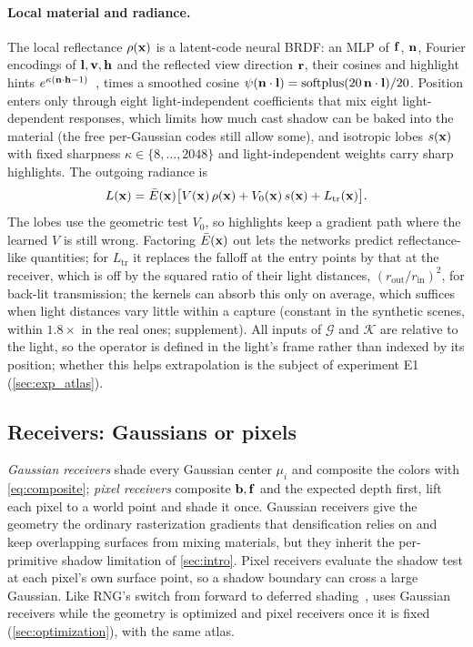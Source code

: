 \paragraph{Local material and radiance.}
The local reflectance $\rho(\mathbf{x})$ is a latent-code neural BRDF: an MLP of $\mathbf{f}$, $\mathbf{n}$, Fourier encodings of $\mathbf{l},\mathbf{v},\mathbf{h}$ and the reflected view direction $\mathbf{r}$, their cosines and highlight hints $e^{\kappa(\mathbf{n}\cdot\mathbf{h}-1)}$~\cite{zeng2023nrhints}, times a smoothed cosine $\psi(\mathbf{n}\cdot\mathbf{l})=\operatorname{softplus}(20\,\mathbf{n}\cdot\mathbf{l})/20$.
Position enters only through eight light-independent coefficients that mix eight light-dependent responses, which limits how much cast shadow can be baked into the material (the free per-Gaussian codes still allow some), and isotropic lobes $s(\mathbf{x})$ with fixed sharpness $\kappa\in\{8,\dots,2048\}$ and light-independent weights carry sharp highlights.
The outgoing radiance is
\begin{equation}
  L(\mathbf{x})=\bar E(\mathbf{x})\big[V(\mathbf{x})\,\rho(\mathbf{x})+V_0(\mathbf{x})\,s(\mathbf{x})+L_{\mathrm{tr}}(\mathbf{x})\big].
  \label{eq:radiance}
\end{equation}
The lobes use the geometric test $V_0$, so highlights keep a gradient path where the learned $V$ is still wrong.
Factoring $\bar E(\mathbf{x})$ out lets the networks predict reflectance-like quantities; for $L_{\mathrm{tr}}$ it replaces the falloff at the entry points by that at the receiver, which is off by the squared ratio of their light distances, $(r_{\mathrm{out}}/r_{\mathrm{in}})^2$, for back-lit transmission; the kernels can absorb this only on average, which suffices when light distances vary little within a capture (constant in the synthetic scenes, within $1.8\times$ in the real ones; supplement).
All inputs of $\mathcal G$ and $\mathcal K$ are relative to the light, so the operator is defined in the light's frame rather than indexed by its position; whether this helps extrapolation is the subject of experiment E1 (\cref{sec:exp_atlas}).

\subsection{Receivers: Gaussians or pixels}
\label{sec:receivers}
\emph{Gaussian receivers} shade every Gaussian center $\mu_i$ and composite the colors with \cref{eq:composite}; \emph{pixel receivers} composite $\mathbf{b},\mathbf{f}$ and the expected depth first, lift each pixel to a world point and shade it once.
Gaussian receivers give the geometry the ordinary rasterization gradients that densification relies on and keep overlapping surfaces from mixing materials, but they inherit the per-primitive shadow limitation of \cref{sec:intro}.
Pixel receivers evaluate the shadow test at each pixel's own surface point, so a shadow boundary can cross a large Gaussian.
Like RNG's switch from forward to deferred shading~\cite{fan2025rng}, \ours uses Gaussian receivers while the geometry is optimized and pixel receivers once it is fixed (\cref{sec:optimization}), with the same atlas.
